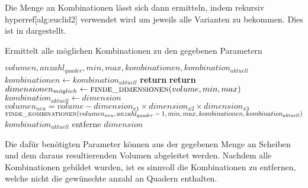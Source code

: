 \documentclass[a4paper,10pt,ngerman]{scrartcl}
\begin{document}
    Die Menge an Kombinationen lässt sich dann ermitteln,
    indem rekursiv hyperref[alg:euclid2]{} verwendet wird um jeweils alle Varianten zu bekommen.
    Dies ist in \hyperref[alg:euclid2]{} dargestellt.

    \begin{algorithm}
        \caption{Ermittelt alle möglichen Kombinationen zu den gegebenen Parametern}\label{alg:euclid}
        \begin{algorithmic}[1]
            \Require $volumen, anzahl_{quader}, min, max, kombinationen, kombination_{aktuell}$
                    \State $kombinationen \gets kombination_{aktuell}$
                    \State \textbf{return}
                \EndIf
                    \State \textbf{return}
                \EndIf
                \State $dimensionen_{m\ddot oglich} \gets \textsc{finde\_dimensionen}(volume, min, max)$
                    \State $kombination_{aktuell} \gets dimension$
                    \State $volumen_{neu} = volume - dimension_{x1} \times dimension_{x2} \times dimension_{x3}$
                    \State $\textsc{finde\_kombinationen}(volumen_{neu}, anzahl_{quader} - 1, min, max, kombinationen, kombination_{aktuell})$
                    \State $kombination_{aktuell}$ entferne $dimension$
                \EndFor
            \EndFunction
        \end{algorithmic}
    \end{algorithm}

    Die dafür benötigten Parameter können aus der gegebenen Menge an Scheiben und dem daraus resultierenden Volumen abgeleitet werden.
    Nachdem alle Kombinationen gebildet wurden, ist es sinnvoll die Kombinationen zu entfernen, welche nicht die gewünschte anzahl an Quadern enthalten.
\end{document}
